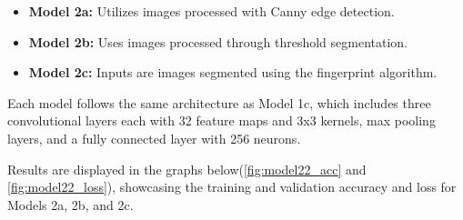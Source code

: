 \begin{itemize}
    \item \textbf{Model 2a:} Utilizes images processed with Canny edge detection.
    \item \textbf{Model 2b:} Uses images processed through threshold segmentation.
    \item \textbf{Model 2c:} Inputs are images segmented using the fingerprint algorithm.
\end{itemize}

Each model follows the same architecture as Model 1c, which includes three convolutional layers each with 32 feature maps and 3x3 kernels, max pooling layers, and a fully connected layer with 256 neurons.

Results are displayed in the graphs below(\autoref{fig:model22_acc} and \autoref{fig:model22_loss}), showcasing the training and validation accuracy and loss for Models 2a, 2b, and 2c.
